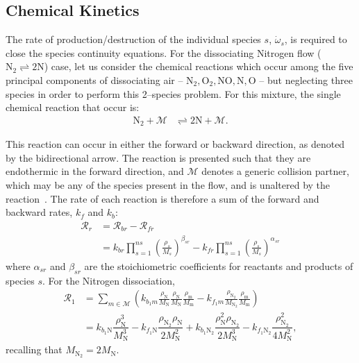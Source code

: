 \documentclass[10pt]{article}
\begin{document}
\subsection{Chemical Kinetics}
The rate of production/destruction of the individual species $s$, $\dot{\omega}_s$, is required to close the species continuity equations. For the dissociating Nitrogen flow ($  \text{N}_2 \rightleftharpoons 2 \text{N}$) case, let us consider the chemical reactions which occur among the five principal components of dissociating air -- $\text{N}_2,\text{O}_2,\text{NO},\text{N},\text{O}$ -- but neglecting three species in order to perform this 2--species problem. For this mixture, the single chemical reaction that occur is:
\begin{align*}
 \text{N}_2 + \mathcal{M} &\rightleftharpoons 2\text{N} + \mathcal{M} .
\end{align*}

This reaction can occur in either the forward or backward direction, as denoted by the bidirectional arrow. The reaction is presented such that they are endothermic in the forward direction, and $\mathcal{M}$ denotes a generic collision partner, which may be any of the species present in the flow, and  is unaltered by the reaction~\citep{Kirk2011}.
The rate of each reaction is therefore a sum of the forward and backward rates,  $k_{f}$ and $k_{b}$:
\begin{equation*}
 \begin{split}
\mathcal{R}_r &=  \mathcal{R}_{br} - \mathcal{R}_{fr} \\
                &= k_{br} \prod_{s=1}^{ns} \left(\frac{\rho_s}{M_s}\right)^{\beta_{sr}} - k_{fr} \prod_{s=1}^{ns} \left(\frac{\rho_s}{M_s}\right)^{\alpha_{sr}}
 \end{split}
\end{equation*}
where $\alpha_{sr}$ and $\beta_{sr}$ are the stoichiometric coefficients for reactants and products of species $s$.
For the Nitrogen dissociation,
\begin{equation}
\begin{split}             	                
\label{eq:reaction1}
 \mathcal{R}_1 &= \sum_{m\in\mathcal{M}}\left(k_{b_1 m} \frac{\rho_{\text{N}}}{M_{\text{N}}}\frac{\rho_{\text{N}}}{M_{\text{N}}}\frac{\rho_{\text{m}}}{M_{\text{m}}} - k_{f_1 m}\frac{\rho_{\text{N}_2}}{M_{\text{N}_2}}\frac{\rho_{\text{m}}}{M_{\text{m}}} \right) \\
%
&= k_{b_1 \text{N}} \dfrac{\rho_{\text{N}}^3}{M_\text{N}^3} -
k_{f_1 \text{N}}   \dfrac{\rho_{\text{N}_2} \rho_{\text{N}}}{2  M_\text{N}^2}+
k_{b_1 \text{N}_2} \dfrac{\rho_\text{N}^2 \rho_{\text{N}_2}}{2M_\text{N}^3 }-
k_{f_1 \text{N}_2} \dfrac{\rho_{\text{N}_2}^2}{4 M_\text{N}^2},
\end{split}
\end{equation}
recalling that $M_{\text{N}_2}=2 M_\text{N}.$
\end{document}
